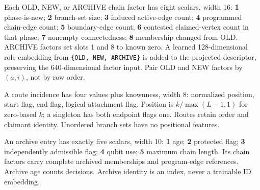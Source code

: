\documentclass[10pt,a4paper]{article}
\begin{document}
Each OLD, NEW, or ARCHIVE chain factor has eight scalars, width 16:
\textbf{1} phase-is-new; \textbf{2} branch-set size; \textbf{3} induced
active-edge count; \textbf{4} programmed chain-edge count; \textbf{5}
boundary-edge count; \textbf{6} contested claimed-vertex count in that
phase; \textbf{7} nonempty connectedness; \textbf{8} membership changed
from OLD. ARCHIVE factors set slots 1 and 8 to known zero. A learned
128-dimensional role embedding from \texttt{\{OLD,\ NEW,\ ARCHIVE\}} is
added to the projected descriptor, preserving the 640-dimensional factor
input. Pair OLD and NEW factors by \((a,i)\), not by row order.

A route incidence has four values plus knownness, width 8: normalized
position, start flag, end flag, logical-attachment flag. Position is
\(k/\max(L-1,1)\) for zero-based \(k\); a singleton has both endpoint
flags one. Routes retain order and claimant identity. Unordered branch
sets have no positional features.

An archive entry has exactly five scalars, width 10: \textbf{1} age;
\textbf{2} protected flag; \textbf{3} independently admissible flag;
\textbf{4} qubit use; \textbf{5} maximum chain length. Its chain factors
carry complete archived memberships and program-edge references. Archive
age counts decisions. Archive identity is an index, never a trainable ID
embedding.

\begingroup\small
\end{document}
